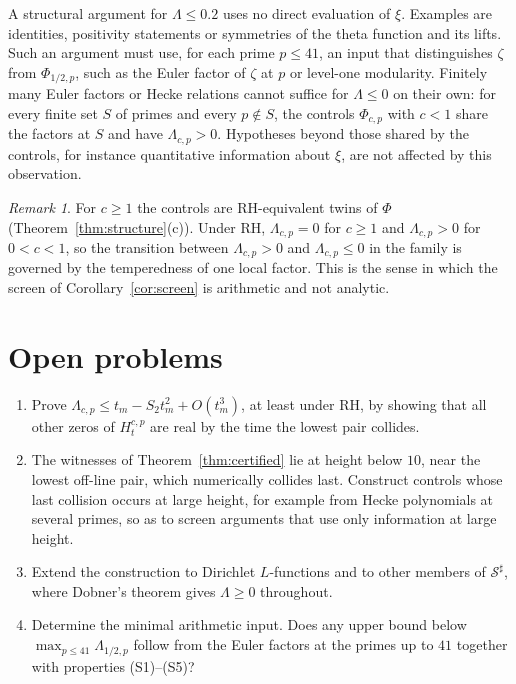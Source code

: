 \documentclass[11pt]{article}
\numberwithin{equation}{section}
\theoremstyle{definition}
\theoremstyle{remark}
\newtheorem{remark}[theorem]{Remark}
\newcommand{\Sh}{\mathcal S^\sharp}
\begin{document}
A structural argument for $\Lambda\le0.2$ uses no direct evaluation of $\xi$.
Examples are identities, positivity statements or symmetries of the theta
function and its lifts. Such an argument must use, for each prime $p\le41$, an
input that distinguishes $\zeta$ from $\Phi_{1/2,p}$, such as the Euler factor
of $\zeta$ at $p$ or level-one modularity. Finitely many Euler factors or Hecke
relations cannot suffice for $\Lambda\le0$ on their own: for every finite set
$S$ of primes and every $p\notin S$, the controls $\Phi_{c,p}$ with $c<1$ share
the factors at $S$ and have $\Lambda_{c,p}>0$. Hypotheses beyond those shared
by the controls, for instance quantitative information about $\xi$, are not
affected by this observation.

\begin{remark}
For $c\ge1$ the controls are RH-equivalent twins of $\Phi$
(Theorem~\ref{thm:structure}(c)). Under RH, $\Lambda_{c,p}=0$ for $c\ge1$
and $\Lambda_{c,p}>0$ for $0<c<1$, so the transition between
$\Lambda_{c,p}>0$ and $\Lambda_{c,p}\le0$ in the family is governed by the
temperedness of one local factor. This is the sense in which the screen of
Corollary~\ref{cor:screen} is arithmetic and not analytic.
\end{remark}

\section{Open problems}\label{sec:open}
\begin{enumerate}[label=(\arabic*)]
\item Prove $\Lambda_{c,p}\le t_m-S_2t_m^2+O(t_m^3)$, at least under RH, by
showing that all other zeros of $H^{c,p}_t$ are real by the time the
lowest pair collides.
\item The witnesses of Theorem~\ref{thm:certified} lie at height below $10$,
near the lowest off-line pair, which numerically collides last. Construct
controls whose last collision occurs at large height, for example from
Hecke polynomials at several primes, so as to screen arguments that use
only information at large height.
\item Extend the construction to Dirichlet $L$-functions and to other members
of $\Sh$, where Dobner's theorem gives $\Lambda\ge0$ throughout.
\item Determine the minimal arithmetic input. Does any upper bound below
$\max_{p\le41}\Lambda_{1/2,p}$ follow from the Euler factors at the primes
up to $41$ together with properties (S1)--(S5)?
\end{enumerate}
\end{document}
